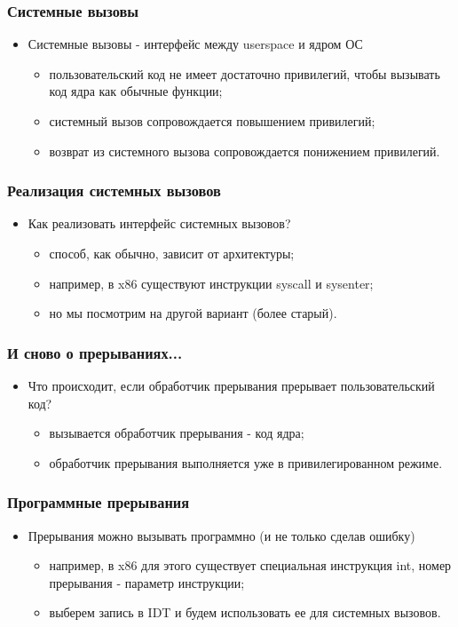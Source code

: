 \begin{frame}
\frametitle{Системные вызовы}
\begin{itemize}
    \item<1->Системные вызовы - интерфейс между userspace и ядром ОС
    \begin{itemize}
        \item<2->пользовательский код не имеет достаточно привилегий,
             чтобы вызывать код ядра как обычные функции;
        \item<3->системный вызов сопровождается повышением привилегий;
        \item<4->возврат из системного вызова сопровождается понижением
             привилегий.
    \end{itemize}
\end{itemize}
\end{frame}

\begin{frame}
\frametitle{Реализация системных вызовов}
\begin{itemize}
    \item<1->Как реализовать интерфейс системных вызовов?
    \begin{itemize}
        \item<2->способ, как обычно, зависит от архитектуры;
        \item<3->например, в x86 существуют инструкции syscall и sysenter;
        \item<4->но мы посмотрим на другой вариант (более старый).
    \end{itemize}
\end{itemize}
\end{frame}

\begin{frame}
\frametitle{И сново о прерываниях...}
\begin{itemize}
    \item<1->Что происходит, если обработчик прерывания прерывает
         пользовательский код?
    \begin{itemize}
        \item<2->вызывается обработчик прерывания - код ядра;
        \item<3->обработчик прерывания выполняется уже в привилегированном
             режиме.
    \end{itemize}
\end{itemize}
\end{frame}

\begin{frame}
\frametitle{Программные прерывания}
\begin{itemize}
    \item<1->Прерывания можно вызывать программно (и не только сделав ошибку)
    \begin{itemize}
        \item<2->например, в x86 для этого существует специальная инструкция
             int, номер прерывания - параметр инструкции;
        \item<3->выберем запись в IDT и будем использовать ее для системных
             вызовов.
    \end{itemize}
\end{itemize}
\end{frame}

